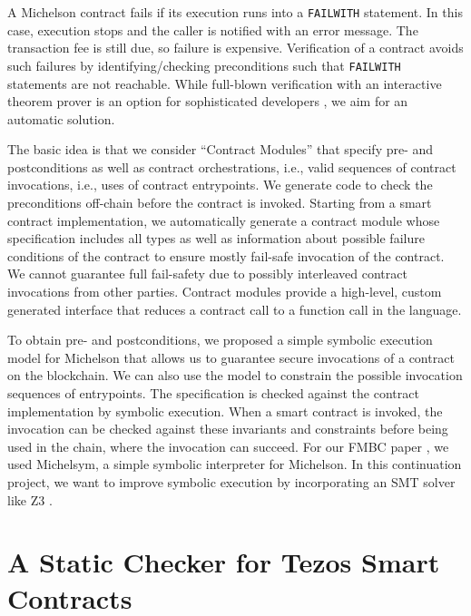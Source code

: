 \documentclass[a4paper,11pt]{article}
\begin{document}
A Michelson contract fails if its execution runs into a \texttt{FAILWITH} statement. In this case, execution stops and the caller is notified with an error message. The transaction fee is still due, so failure is expensive. Verification of a contract avoids such failures by identifying/checking preconditions such that \texttt{FAILWITH} statements are not reachable. While full-blown verification with an interactive theorem prover is an option for sophisticated developers \cite{DBLP:conf/isola/BernardoCCJPT20}, we aim for an automatic solution.

The basic idea is that we consider ``Contract Modules'' that specify pre- and postconditions as well as contract orchestrations, i.e., valid sequences of contract invocations, i.e., uses of contract entrypoints. We generate code to check the preconditions off-chain before the contract is invoked. Starting from a smart contract implementation, we automatically generate a contract module whose specification includes all types as well as information about possible failure conditions of the contract to ensure mostly fail-safe invocation of the contract. We cannot guarantee full fail-safety due to possibly interleaved contract invocations from other parties.  Contract modules provide a high-level, custom generated interface that reduces a contract call to a function call in the language.


To obtain pre- and postconditions, we proposed a simple symbolic execution model for Michelson that allows us to guarantee secure invocations of a contract on the blockchain.
 We can also use the model to constrain the possible invocation sequences of entrypoints. The specification is checked against the contract implementation by symbolic execution. When a smart contract is invoked, the invocation can be checked against these invariants and constraints before being used in the chain, where the invocation can succeed. For our FMBC paper \cite{DBLP:conf/cav/Doan021}, we used Michelsym, a simple symbolic interpreter for Michelson. In this continuation project, we want to improve symbolic execution by incorporating an SMT solver like Z3 \cite{DBLP:conf/tacas/MouraB08}. 

\section{A Static Checker for Tezos Smart Contracts}
\label{sec:static-checker}
\end{document}
